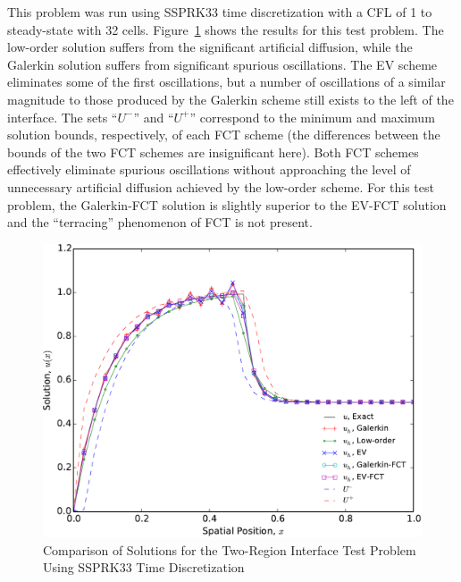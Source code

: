 This problem was run using SSPRK33 time discretization with a CFL of 1 to
steady-state with 32 cells. Figure~\ref{fig:interface} shows the results
for this test problem. The low-order solution suffers from the significant
artificial diffusion, while the Galerkin solution suffers from significant
spurious oscillations. The EV scheme eliminates some of the first oscillations,
but a number of oscillations of a similar magnitude to those produced by
the Galerkin scheme still exists to the left of the interface.
The sets ``$U^-$'' and ``$U^+$'' correspond to the minimum and maximum solution
bounds, respectively, of each FCT scheme (the differences between the bounds of the two FCT
schemes are insignificant here).
Both FCT schemes effectively eliminate spurious oscillations without approaching
the level of unnecessary artificial diffusion achieved by the low-order
scheme. For this test problem, the Galerkin-FCT solution is slightly
superior to the EV-FCT solution and the ``terracing'' phenomenon
of FCT is not present.

\begin{figure}[htb]
   \centering
      \includegraphics[width=\textwidth]
        {images/solution_interface.pdf}
      \caption{Comparison of Solutions for the Two-Region Interface Test
       Problem Using SSPRK33 Time Discretization}
   \label{fig:interface}
\end{figure}
\clearpage
